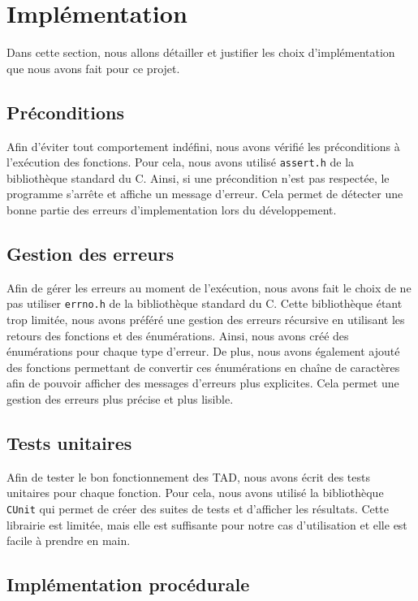 \section{Implémentation}

Dans cette section, nous allons détailler et justifier les choix d'implémentation que nous avons fait pour ce projet.

\subsection{Préconditions}

Afin d'éviter tout comportement indéfini, nous avons vérifié les préconditions à l'exécution des fonctions.
Pour cela, nous avons utilisé \texttt{assert.h} de la bibliothèque standard du C. 
Ainsi, si une précondition n'est pas respectée, le programme s'arrête et affiche un message d'erreur.
Cela permet de détecter une bonne partie des erreurs d'implementation lors du développement.

\subsection{Gestion des erreurs}

Afin de gérer les erreurs au moment de l'exécution, nous avons fait le choix de ne pas utiliser \texttt{errno.h} de la bibliothèque standard du C.
Cette bibliothèque étant trop limitée, nous avons préféré une gestion des erreurs récursive en utilisant les retours des fonctions et des énumérations.
Ainsi, nous avons créé des énumérations pour chaque type d'erreur. De plus, nous avons également ajouté des fonctions permettant de convertir ces énumérations en chaîne de caractères afin de pouvoir afficher des messages d'erreurs plus explicites.
Cela permet une gestion des erreurs plus précise et plus lisible.

\subsection{Tests unitaires}

Afin de tester le bon fonctionnement des TAD, nous avons écrit des tests unitaires pour chaque fonction.
Pour cela, nous avons utilisé la bibliothèque \texttt{CUnit} qui permet de créer des suites de tests et d'afficher les résultats.
Cette librairie est limitée, mais elle est suffisante pour notre cas d'utilisation et elle est facile à prendre en main.

\subsection{Implémentation procédurale}

